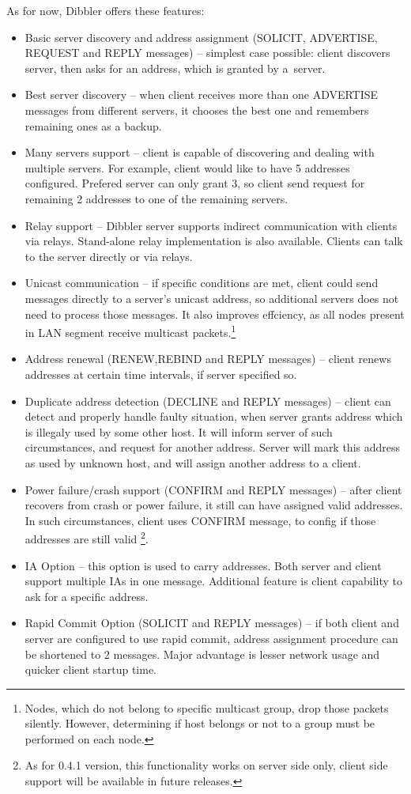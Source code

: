 As for now, Dibbler offers these features:
\begin{itemize}
\item Basic server discovery and address assignment (SOLICIT,
  ADVERTISE, REQUEST and REPLY messages) -- simplest case possible:
  client discovers server, then asks for an address, which is granted
  by a~server.
\item Best server discovery -- when client receives more than one
  ADVERTISE messages from different servers, it chooses the best one
  and remembers remaining ones as a backup.
\item Many servers support -- client is capable of discovering and
  dealing with multiple servers. For example, client would like to
  have 5 addresses configured. Prefered server can only grant 3, so
  client send request for remaining 2 addresses to one of the
  remaining servers.
\item Relay support -- Dibbler server supports indirect
  communication with clients via relays. Stand-alone relay implementation is also
  available. Clients can talk to the server directly or via relays.
\item Unicast communication -- if specific conditions are met, client
  could send messages directly to a server's unicast address, so
  additional servers does not need to process those messages. It also
  improves effciency, as all nodes present in LAN segment receive
  multicast packets.\footnote{Nodes, which do not belong to specific
    multicast group, drop those packets silently. However, determining
    if host belongs or not to a group must be performed on each node.}
\item Address renewal (RENEW,REBIND and REPLY messages) -- client renews
  addresses at certain time intervals, if server specified so.
\item Duplicate address detection (DECLINE and REPLY messages) -- client
  can detect and properly handle faulty situation, when server grants
  address which is illegaly used by some other host. It will inform
  server of such circumstances, and request for another
  address. Server will mark this address as used by unknown host, and
  will assign another address to a client.
\item Power failure/crash support (CONFIRM and REPLY messages) -- after
  client recovers from crash or power failure, it still can have
  assigned valid addresses. In such circumstances, client uses CONFIRM
  message, to config if those addresses are still valid%
  \footnote{As for 0.4.1 version, this functionality works on server side only,
  client side support will be available in future releases.}.
\item IA Option -- this option is used to carry addresses. Both server
  and client support multiple IAs in one message. Additional feature
  is client capability to ask for a specific address.
\item Rapid Commit Option (SOLICIT and REPLY messages) -- if both
  client and server are configured to use rapid commit, address
  assignment procedure can be shortened to 2 messages. Major
  advantage is lesser network usage and quicker client startup time.
\end{itemize}

